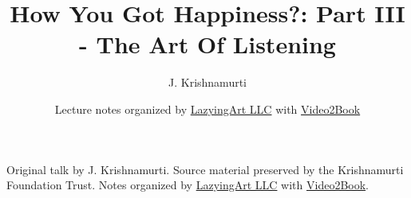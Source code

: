 \documentclass[11pt,oneside]{book}
\begin{document}
\frontmatter
\title{How You Got Happiness?: Part III - The Art Of Listening}
\author{J. Krishnamurti}
\date{Lecture notes organized by \href{https://lazying.art}{LazyingArt LLC} with \href{https://github.com/lachlanchen/Video2Book}{Video2Book}}
\maketitle
\begin{center}
\small Original talk by J. Krishnamurti. Source material preserved by the Krishnamurti Foundation Trust. Notes organized by \href{https://lazying.art}{LazyingArt LLC} with \href{https://github.com/lachlanchen/Video2Book}{Video2Book}.
\end{center}
\clearpage
\mainmatter

\end{document}
